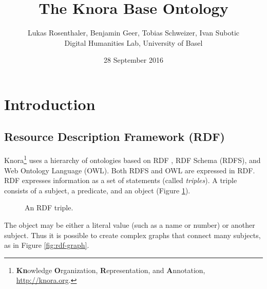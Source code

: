 \documentclass[12pt, a4paper]{article}
\title{The Knora Base Ontology}
\author{Lukas Rosenthaler, Benjamin Geer, Tobias Schweizer, Ivan Subotic\\Digital Humanities Lab, University of Basel}
\date{28 September 2016}
\begin{document}
\maketitle

\listoftodos

\tableofcontents

\section{Introduction}

\subsection{Resource Description Framework (RDF)}
Knora\footnote{{\bf Kn}owledge {\bf O}rganization, {\bf R}epresentation, and {\bf A}nnotation, \url{http://knora.org}.} uses a hierarchy of ontologies based on RDF \cite{RDF_Primer_1_1}, RDF Schema (RDFS)\cite{RDF_Schema_1_1}, and Web Ontology Language (OWL)\cite{OWL_2_Primer}. Both RDFS and OWL are expressed in RDF. RDF expresses information as a set of statements (called {\em triples}). A triple consists of a subject, a predicate, and an object (Figure \ref{fig:rdf-triple}).

\begin{figure}[h]
\centering
{}
\caption{An RDF triple.}
\label{fig:rdf-triple}
\end{figure}

The object may be either a literal value (such as a name or number) or another subject. Thus it is possible to create complex graphs that connect many subjects, as in Figure \ref{fig:rdf-graph}.
\end{document}
